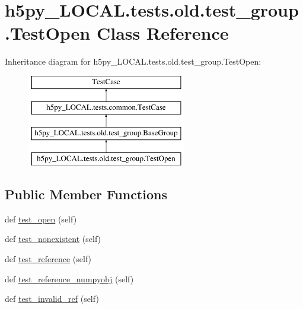 \hypertarget{classh5py__LOCAL_1_1tests_1_1old_1_1test__group_1_1TestOpen}{}\section{h5py\+\_\+\+L\+O\+C\+A\+L.\+tests.\+old.\+test\+\_\+group.\+Test\+Open Class Reference}
\label{classh5py__LOCAL_1_1tests_1_1old_1_1test__group_1_1TestOpen}
Inheritance diagram for h5py\+\_\+\+L\+O\+C\+A\+L.\+tests.\+old.\+test\+\_\+group.\+Test\+Open\+:\begin{figure}[H]
\begin{center}
\leavevmode
\includegraphics[height=4.000000cm]{classh5py__LOCAL_1_1tests_1_1old_1_1test__group_1_1TestOpen}
\end{center}
\end{figure}
\subsection*{Public Member Functions}
\begin{DoxyCompactItemize}
\item 
def \hyperlink{classh5py__LOCAL_1_1tests_1_1old_1_1test__group_1_1TestOpen_a73bf166913956af15d9c5a4a442aec3c}{test\+\_\+open} (self)
\item 
def \hyperlink{classh5py__LOCAL_1_1tests_1_1old_1_1test__group_1_1TestOpen_a6a72116c5cc218b9ae57d8b983374202}{test\+\_\+nonexistent} (self)
\item 
def \hyperlink{classh5py__LOCAL_1_1tests_1_1old_1_1test__group_1_1TestOpen_a9469709d5d5336815eed290287b46d5d}{test\+\_\+reference} (self)
\item 
def \hyperlink{classh5py__LOCAL_1_1tests_1_1old_1_1test__group_1_1TestOpen_a9458f640cd8ae18bd56071d00f30a915}{test\+\_\+reference\+\_\+numpyobj} (self)
\item 
def \hyperlink{classh5py__LOCAL_1_1tests_1_1old_1_1test__group_1_1TestOpen_a03b2b45528fc0d048495a33f4f3c84b9}{test\+\_\+invalid\+\_\+ref} (self)
\end{DoxyCompactItemize}
